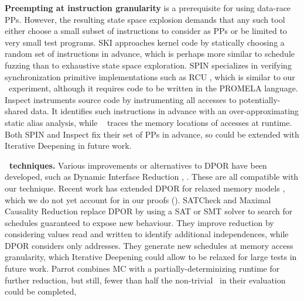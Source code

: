 {\bf Preempting at instruction granularity} is a prerequisite for using data-race PPs.
However, the resulting state space explosion demands that any such tool either
choose a small subset of instructions to consider as PPs
or be limited to very small test programs.
SKI \cite{ski} approaches kernel code by statically choosing a random set of instructions in advance, %
which is perhaps more similar to
schedule fuzzing \cite{randomized-scheduler} than to exhaustive state space exploration.
%
SPIN \cite{spin} specializes in verifying synchronization primitive implementations such as RCU \cite{rcu}, which is similar to our \mxtest~experiment,
although it requires code to be written in the PROMELA language.
%
Inspect \cite{inspect} instruments source code by
instrumenting
all accesses to potentially-shared data.
It identifies such instructions in advance with an over-approximating static alias analysis,
while \landslide~\cite{landslide} traces the memory locations of accesses at runtime.
Both SPIN and Inspect fix their set of PPs in advance, so could be
extended with Iterative Deepening in future work.

{\bf {}~techniques.} Various improvements or alternatives to DPOR have been developed, such as Dynamic Interface Reduction \cite{demeter},
.
These are all compatible with our technique.
%
Recent work \cite{tsopso} has extended DPOR for relaxed memory models \cite{memory-consistency-models},
which we do not yet account for in our proofs (\sect{\ref{sec:soundness}}).
%
SATCheck \cite{satcheck} and Maximal Causality Reduction \cite{mcr} replace DPOR by
using a SAT or SMT solver to search for schedules guaranteed to expose new behaviour.
They improve
reduction by considering values read and written to identify additional independences,
while DPOR considers only addresses.
They generate new schedules at
memory access granularity,
which Iterative Deepening could allow to be relaxed for large tests in future work.
%
Parrot \cite{parrot} combines MC with a partially-determinizing runtime for further reduction, but still, fewer than half the non-trivial ~in their evaluation could be completed,

